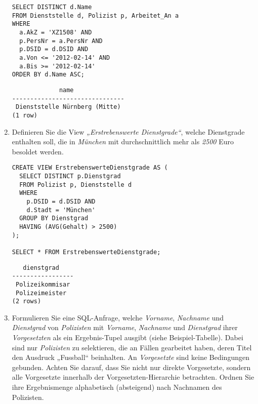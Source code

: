 \documentclass{bschlangaul-aufgabe}
\begin{document}
\begin{enumerate}
\begin{bAntwort}
\begin{verbatim}
SELECT DISTINCT d.Name
FROM Dienststelle d, Polizist p, Arbeitet_An a
WHERE
  a.AkZ = 'XZ1508' AND
  p.PersNr = a.PersNr AND
  p.DSID = d.DSID AND
  a.Von <= '2012-02-14' AND
  a.Bis >= '2012-02-14'
ORDER BY d.Name ASC;
\end{verbatim}

\begin{verbatim}
             name
-------------------------------
 Dienststelle Nürnberg (Mitte)
(1 row)
\end{verbatim}
\end{bAntwort}


\item Definieren Sie die View \emph{„Erstrebenswerte Dienstgrade“},
welche Dienstgrade enthalten soll, die in \emph{München} mit
durchschnittlich mehr als \emph{2500} Euro besoldet werden.

\begin{bAntwort}
\begin{verbatim}
CREATE VIEW ErstrebenswerteDienstgrade AS (
  SELECT DISTINCT p.Dienstgrad
  FROM Polizist p, Dienststelle d
  WHERE
    p.DSID = d.DSID AND
    d.Stadt = 'München'
  GROUP BY Dienstgrad
  HAVING (AVG(Gehalt) > 2500)
);

SELECT * FROM ErstrebenswerteDienstgrade;
\end{verbatim}

\begin{verbatim}
   dienstgrad
-----------------
 Polizeikommisar
 Polizeimeister
(2 rows)
\end{verbatim}
\end{bAntwort}


\item Formulieren Sie eine SQL-Anfrage, welche \emph{Vorname},
\emph{Nachname} und \emph{Dienstgrad} von \emph{Polizisten} mit
\emph{Vorname}, \emph{Nachname} und \emph{Dienstgrad} ihrer
\emph{Vorgesetzten} als ein Ergebnis-Tupel ausgibt (siehe
Beispiel-Tabelle). Dabei sind nur \emph{Polizisten} zu selektieren, die
an Fällen gearbeitet haben, deren Titel den Ausdruck „Fussball“
beinhalten. An \emph{Vorgesetzte} sind keine Bedingungen gebunden.
Achten Sie darauf, dass Sie nicht nur direkte Vorgesetzte, sondern alle
Vorgesetzte innerhalb der Vorgesetzten-Hierarchie betrachten. Ordnen Sie
ihre Ergebnismenge alphabetisch (absteigend) nach Nachnamen des
Polizisten.


\end{enumerate}
\end{document}
